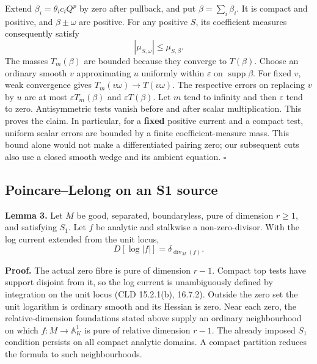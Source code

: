 \documentclass[
  10pt,
]{article}
\begin{document}
Extend \(\beta_i=\theta_ic_iQ^p\) by zero after pullback, and put
\(\beta=\sum_i\beta_i\). It is compact and positive, and
\(\beta\pm\omega\) are positive. For any positive \(S\), its coefficient
measures consequently satisfy \[
 |\mu_{S,\omega}|\leq\mu_{S,\beta}.
\] The masses \(T_m(\beta)\) are bounded because they converge to
\(T(\beta)\). Choose an ordinary smooth \(v\) approximating \(u\)
uniformly within \(\varepsilon\) on \(\operatorname{supp}\beta\). For
fixed \(v\), weak convergence gives \(T_m(v\omega)\to T(v\omega)\). The
respective errors on replacing \(v\) by \(u\) are at most
\(\varepsilon T_m(\beta)\) and \(\varepsilon T(\beta)\). Let \(m\) tend
to infinity and then \(\varepsilon\) tend to zero. Antisymmetric tests
vanish before and after scalar multiplication. This proves the claim. In
particular, for a \textbf{fixed} positive current and a compact test,
uniform scalar errors are bounded by a finite coefficient-measure mass.
This bound alone would not make a differentiated pairing zero; our
subsequent cuts also use a closed smooth wedge and its ambient equation.
\(\square\)

\subsection{Poincare--Lelong on an S1
source}\label{poincarelelong-on-an-s1-source}

\textbf{Lemma 3.} Let \(M\) be good, separated, boundaryless, pure of
dimension \(r\geq1\), and satisfying \(S_1\). Let \(f\) be analytic and
stalkwise a non-zero-divisor. With the log current extended from the
unit locus, \[
 D[\log|f|]=\delta_{\operatorname{div}_M(f)}.              \tag{3}
\]

\textbf{Proof.} The actual zero fibre is pure of dimension \(r-1\).
Compact top tests have support disjoint from it, so the log current is
unambiguously defined by integration on the unit locus (CLD 15.2.1(b),
16.7.2). Outside the zero set the unit logarithm is ordinary smooth and
its Hessian is zero. Near each zero, the relative-dimension foundations
stated above supply an ordinary neighbourhood on which
\(f:M\to\mathbb A^1_K\) is pure of relative dimension \(r-1\). The
already imposed \(S_1\) condition persists on all compact analytic
domains. A compact partition reduces the formula to such neighbourhoods.
\end{document}
